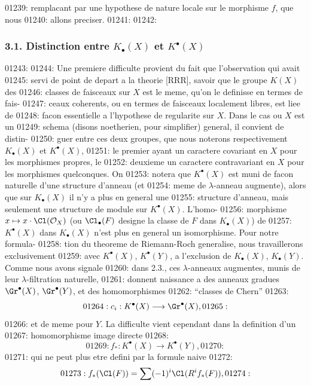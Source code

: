 01239: remplacant par une hypothese de nature locale sur le morphisme $f$, que nous
01240: allons preciser.
01241: 
01242: \subsubsection*{3.1. Distinction entre $K_{\bullet}(X)$ et $K^{\bullet}(X)$}
01243: 
01244: Une premiere difficulte provient du fait que l'observation qui avait
01245: servi de point de depart a la theorie [RRR], savoir que le groupe $K(X)$ des
01246: classes de faisceaux sur $X$ est le meme, qu'on le definisse en termes de fais-
01247: ceaux coherents, ou en termes de faisceaux localement libres, est liee de
01248: facon essentielle a l'hypothese de regularite sur $X$. Dans le cas ou $X$ est un
01249: schema (disons noetherien, pour simplifier) general, il convient de distin-
01250: guer entre ces deux groupes, que nous noterons respectivement $K_{\bullet}(X)$ et $K^{\bullet}(X)$,
01251: le premier ayant un caractere covariant en $X$ pour les morphismes propres, le
01252: deuxieme un caractere contravariant en $X$ pour les morphismes quelconques. On
01253: notera que $K^{\bullet}(X)$ est muni de facon naturelle d'une structure d'anneau (et
01254: meme de $\lambda$-anneau augmente), alors que sur $K_{\bullet}(X)$ il n'y a plus en general une
01255: structure d'anneau, mais seulement une structure de module sur $K^{\bullet}(X)$. L'homo-
01256: morphisme $x \mapsto x \cdot \Cl(\mathcal{O}_X)$ (ou $\Cl_{\bullet}(F)$ designe la classe de $F$ dans $K_{\bullet}(X)$) de
01257: $K^{\bullet}(X)$ dans $K_{\bullet}(X)$ n'est plus en general un isomorphisme. Pour notre formula-
01258: tion du theoreme de Riemann-Roch generalise, nous travaillerons exclusivement
01259: avec $K^{\bullet}(X)$, $K^{\bullet}(Y)$, a l'exclusion de $K_{\bullet}(X)$, $K_{\bullet}(Y)$. Comme nous avons signale
01260: dans 2.3., ces $\lambda$-anneaux augmentes, munis de leur $\lambda$-filtration naturelle,
01261: donnent naissance a des anneaux gradues $\Gr^{\bullet}(X)$, $\Gr^{\bullet}(Y)$, et des homomorphismes
01262: ``classes de Chern''
01263: \[
01264: c_i: K^{\bullet}(X) \longrightarrow \Gr^{\bullet}(X),
01265: \]
01266: et de meme pour $Y$. La difficulte vient cependant dans la definition d'un
01267: homomorphisme image directe
01268: \begin{equation}
01269: f_{*}: K^{\bullet}(X) \longrightarrow K^{\bullet}(Y),
01270: \end{equation}
01271: qui ne peut plus etre defini par la formule naive
01272: \[
01273: f_{*}(\Cl(F)) = \sum (-1)^i \Cl(R^i f_{*}(F)),
01274: \]
